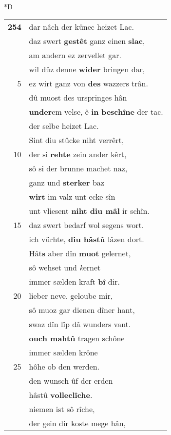\documentclass[8pt,a4paper,notitlepage]{article}
\begin{document}
\begin{table}[ht]
\begin{minipage}[t]{0.5\linewidth}
\small
\begin{center}*D
\end{center}
\begin{tabular}{rl}
\textbf{254} & dar nâch der künec heizet Lac.\\ 
 & daz swert \textbf{gestêt} ganz einen \textbf{slac},\\ 
 & am andern ez zervellet gar.\\ 
 & wil dûz denne \textbf{wider} bringen dar,\\ 
5 & ez wirt ganz von \textbf{des} wazzers trân.\\ 
 & dû muost des urspringes hân\\ 
 & \textbf{under}em velse, ê \textbf{in} \textbf{beschîne} der tac.\\ 
 & der selbe heizet Lac.\\ 
 & Sint diu stücke niht verrêrt,\\ 
10 & der si \textbf{rehte} zein ander kêrt,\\ 
 & sô si der brunne machet naz,\\ 
 & ganz und \textbf{sterker} baz\\ 
 & \textbf{wirt} im valz unt ecke sîn\\ 
 & unt vliesent \textbf{niht diu mâl} ir schîn.\\ 
15 & daz swert bedarf wol segens wort.\\ 
 & ich vürhte, \textbf{diu hâstû} lâzen dort.\\ 
 & Hât\textbf{s} aber dîn \textbf{muot} gelernet,\\ 
 & sô wehset und \textit{k}ernet\\ 
 & immer sælden kraft \textbf{bî} dir.\\ 
20 & lieber neve, geloube mir,\\ 
 & sô muoz gar dienen dîner hant,\\ 
 & swaz dîn lîp dâ wunders vant.\\ 
 & \textbf{ouch mahtû} tragen schône\\ 
 & immer sælden krône\\ 
25 & hôhe ob den werden.\\ 
 & den wunsch ûf der erden\\ 
 & hâstû \textbf{volleclîche}.\\ 
 & niemen ist sô rîche,\\ 
 & der gein dir koste mege hân,\\ 

\end{tabular}
\end{minipage}
\end{table}
\end{document}
